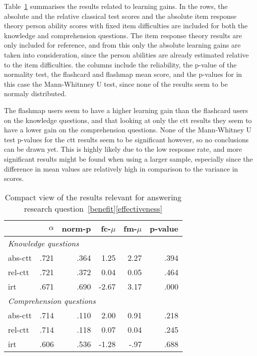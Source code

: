 Table~\ref{tab:learning_gain_effect} summarises the results related to learning gains. In the rows, the absolute and the relative classical test scores and the absolute item response theory person ability scores with fixed item difficulties are included for both the knowledge and comprehension questions. The item response theory results are only included for reference, and from this only the absolute learning gains are taken into consideration, since the person abilities are already estimated relative to the item difficulties. the columns include the reliability, the p-value of the normality test, the flashcard and flashmap mean score, and the p-values for in this case the Mann-Whitnney U test, since none of the results seem to be normaly distributed.

The flashmap users seem to have a higher learning gain than the flashcard users on the knowledge questions, and that looking at only the ctt results they seem to have a lower gain on the comprehension questions. None of the Mann-Whitney U test p-values for the ctt results seem to be significant however, so no conclusions can be drawn yet. This is highly likely due to the low response rate, and more significant results might be found when using a larger sample, especially since the difference in mean values are relatively high in comparison to the variance in scores.

\begin{table}
    \centering
    \begin{tabular}{lrrrrr}
        \toprule
        & $\alpha$ & norm-p & fc-$\mu$ & fm-$\mu$ & p-value \\
        \midrule
        \multicolumn{5}{l}{\emph{Knowledge questions}} \\
        \midrule
        abs-ctt & .721 & .364 & 1.25 & 2.27 & .394 \\
        rel-ctt & .721 & .372 & 0.04 & 0.05 & .464 \\
        irt & .671 & .690 & -2.67 & 3.17 & .000 \\
        \midrule
        \multicolumn{5}{l}{\emph{Comprehension questions}} \\
        \midrule
        abs-ctt & .714 & .110 & 2.00 & 0.91 & .218 \\
        rel-ctt & .714 & .118 & 0.07 & 0.04 & .245\\
        irt & .606 & .536 & -1.28 & -.97 & .688 \\
        \bottomrule
    \end{tabular}
    \caption{Compact view of the results relevant for answering research question~\protect\ref{benefit}\protect\ref{effectiveness}}
    \label{tab:learning_gain_effect}
\end{table}

